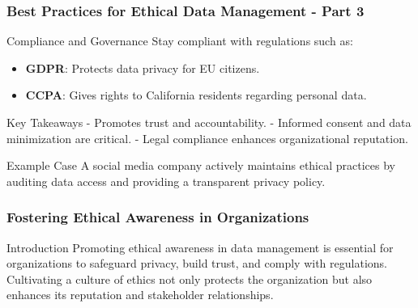\documentclass{beamer}
\begin{document}
\begin{frame}[fragile]
    \frametitle{Best Practices for Ethical Data Management - Part 3}
    \begin{block}{Compliance and Governance}
        Stay compliant with regulations such as:
    \end{block}
    \begin{itemize}
        \item \textbf{GDPR}: Protects data privacy for EU citizens.
        \item \textbf{CCPA}: Gives rights to California residents regarding personal data.
    \end{itemize}
    \begin{block}{Key Takeaways}
        - Promotes trust and accountability.
        - Informed consent and data minimization are critical.
        - Legal compliance enhances organizational reputation.
    \end{block}
    
    \begin{block}{Example Case}
        A social media company actively maintains ethical practices by auditing data access and providing a transparent privacy policy.
    \end{block}
\end{frame}

\begin{frame}[fragile]
    \frametitle{Fostering Ethical Awareness in Organizations}
    \begin{block}{Introduction}
        Promoting ethical awareness in data management is essential for organizations to safeguard privacy, build trust, and comply with regulations. 
        Cultivating a culture of ethics not only protects the organization but also enhances its reputation and stakeholder relationships.
    \end{block}
\end{frame}
\end{document}
